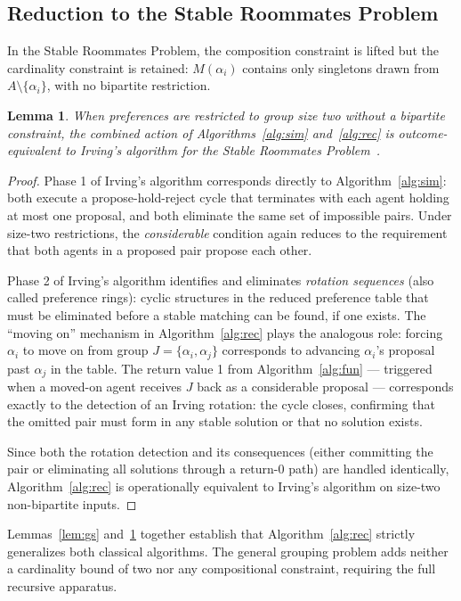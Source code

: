 \documentclass{elsarticle}
\newtheorem{mylem}{Lemma}
\begin{document}
\subsection{Reduction to the Stable Roommates Problem}

In the Stable Roommates Problem, the composition constraint is lifted but the cardinality constraint is retained: $M(\alpha_i)$ contains only singletons drawn from $A \setminus \{\alpha_i\}$, with no bipartite restriction.

\begin{mylem}
\label{lem:irving}
When preferences are restricted to group size two without a bipartite constraint, the combined action of Algorithms~\ref{alg:sim} and~\ref{alg:rec} is outcome-equivalent to Irving's algorithm for the Stable Roommates Problem~\citep{irving85}.
\end{mylem}

\begin{proof}
Phase 1 of Irving's algorithm corresponds directly to Algorithm~\ref{alg:sim}: both execute a propose-hold-reject cycle that terminates with each agent holding at most one proposal, and both eliminate the same set of impossible pairs. Under size-two restrictions, the \emph{considerable} condition again reduces to the requirement that both agents in a proposed pair propose each other.

Phase 2 of Irving's algorithm identifies and eliminates \emph{rotation sequences} (also called preference rings): cyclic structures in the reduced preference table that must be eliminated before a stable matching can be found, if one exists. The ``moving on'' mechanism in Algorithm~\ref{alg:rec} plays the analogous role: forcing $\alpha_i$ to move on from group $J = \{\alpha_i, \alpha_j\}$ corresponds to advancing $\alpha_i$'s proposal past $\alpha_j$ in the table. The return value 1 from Algorithm~\ref{alg:fun} --- triggered when a moved-on agent receives $J$ back as a considerable proposal --- corresponds exactly to the detection of an Irving rotation: the cycle closes, confirming that the omitted pair must form in any stable solution or that no solution exists.

Since both the rotation detection and its consequences (either committing the pair or eliminating all solutions through a return-0 path) are handled identically, Algorithm~\ref{alg:rec} is operationally equivalent to Irving's algorithm on size-two non-bipartite inputs.
\end{proof}

Lemmas~\ref{lem:gs} and~\ref{lem:irving} together establish that Algorithm~\ref{alg:rec} strictly generalizes both classical algorithms. The general grouping problem adds neither a cardinality bound of two nor any compositional constraint, requiring the full recursive apparatus.
\end{document}
